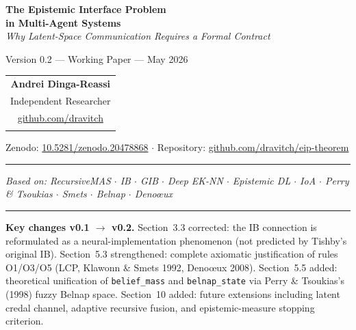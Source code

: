 \documentclass[11pt,a4paper]{article}
\theoremstyle{plain}
\theoremstyle{definition}
\theoremstyle{remark}
\begin{document}
\begin{titlepage}
\centering
\vspace*{1.5cm}

{\LARGE\bfseries The Epistemic Interface Problem\\[0.4em]
in Multi-Agent Systems}\\[0.6em]
{\large\itshape Why Latent-Space Communication Requires a Formal Contract}

\vspace{0.8cm}
{\large Version 0.2 --- Working Paper --- May 2026}

\vspace{0.6cm}
\begin{tabular}{c}
\textbf{Andrei Dinga-Reassi}\\[0.2em]
Independent Researcher\\[0.2em]
\href{https://github.com/dravitch}{github.com/dravitch}\\[0.2em]
\texttt{}
\end{tabular}

\vspace{0.6cm}
{\small
Zenodo: \href{https://doi.org/10.5281/zenodo.20478868}{10.5281/zenodo.20478868}
\quad$\cdot$\quad
Repository: \href{https://github.com/dravitch/eip-theorem}{github.com/dravitch/eip-theorem}
}

\vspace{0.8cm}
\hrule
\vspace{0.4cm}
\begin{minipage}{0.9\textwidth}
\small\itshape
Based on: RecursiveMAS \cite{yang2026} $\cdot$ IB \cite{tishby1999} $\cdot$
GIB \cite{westphal2025} $\cdot$ Deep EK-NN \cite{hoarau2025} $\cdot$
Epistemic DL \cite{manchingal2022} $\cdot$ IoA \cite{ioa2025} $\cdot$
Perry \& Tsoukias \cite{perry1998} $\cdot$ Smets \cite{smets1994} $\cdot$
Belnap \cite{belnap1977} $\cdot$ Deno\oe{}ux \cite{denoeux2008}
\end{minipage}
\vspace{0.4cm}
\hrule

\vspace{0.8cm}
\begin{changebox}
\small
\textbf{Key changes v0.1 $\to$ v0.2.}
Section~3.3 corrected: the IB connection is reformulated as a neural-implementation
phenomenon (not predicted by Tishby's original IB).
Section~5.3 strengthened: complete axiomatic justification of rules O1/O3/O5
(LCP, Klawonn \& Smets 1992, Deno\oe{}ux 2008).
Section~5.5 added: theoretical unification of \texttt{belief\_mass} and
\texttt{belnap\_state} via Perry \& Tsoukias's (1998) fuzzy Belnap space.
Section~10 added: future extensions including latent credal channel, adaptive
recursive fusion, and epistemic-measure stopping criterion.
\end{changebox}


\end{titlepage}
\end{document}
